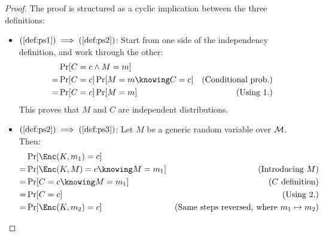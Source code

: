 \begin{proof}
    The proof is structured as a cyclic implication between the three definitions:
    
    \begin{itemize}
        \item $(\ref{def:ps1}) \implies (\ref{def:ps2})$: Start from one side of the independency definition, and work through the other:
        \begin{align*}
             & \Pr[C = c \wedge M = m]              & \\
            =& \Pr[C = c] \Pr[M = m \knowing C = c] & \text{(Conditional prob.)} \\
            =& \Pr[C = c] \Pr[M = m]                & \text{(Using 1.)} \\
        \end{align*}
        This proves that $M$ and $C$ are independent distributions.
        
        \item $(\ref{def:ps2}) \implies (\ref{def:ps3})$: Let $M$ be a generic random variable over $\mathcal{M}$. Then:
        \begin{align*}
             & \Pr[\Enc(K, m_1) = c]                & \\
            =& \Pr[\Enc(K, M) = c \knowing M = m_1] & \text{(Introducing $M$)} \\
            =& \Pr[C = c \knowing M = m_1]          & \text{($C$ definition)} \\
            =& \Pr[C = c]                           & \text{(Using 2.)} \\
            =& \Pr[\Enc(K, m_2) = c]                & \text{(Same steps reversed, where $m_1 \mapsto m_2$)}\\
        \end{align*}


\end{itemize}
\end{proof}
